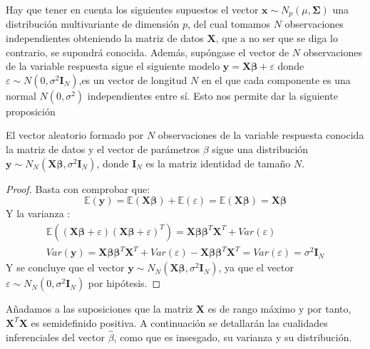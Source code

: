 \noindent Hay que tener en cuenta los siguientes supuestos el vector $\mathbf{x}\sim N_p(\mu, \mathbf{\Sigma})$ una distribución multivariante de dimensión $p$, del cual tomamos $N$ observaciones independientes obteniendo la matriz de datos $\mathbf{X}$, que a no ser que se diga lo contrario, se supondrá conocida. Además, supóngase el vector de $N$ observaciones de la variable respuesta sigue el siguiente modelo $\mathbf{y}= \mathbf{X \beta}+\varepsilon$ donde $\varepsilon \sim N(0,\sigma^2\mathbf{I}_N)$,es un vector de longitud $N$ en el que cada componente es una normal $N(0,\sigma^2)$  independientes entre sí. Esto nos permite dar la siguiente proposición \cite{Cuadras 2014}
\begin{propo}
El vector aleatorio formado por $N$ observaciones de la variable respuesta conocida la matriz de datos y el vector de parámetros $\beta$ sigue una distribución
$\mathbf{y}\sim N_N(\mathbf{X\beta}, \sigma^2\mathbf{I}_N)$, donde $\mathbf{I}_N$ es la matriz identidad de tamaño $N$.  
\begin{proof}
Basta con comprobar que:
\begin{equation}
\mathbb{E}(\mathbf{y})=\mathbb{E}(\mathbf{X\beta})+\mathbb{E}(\varepsilon)=\mathbb{E}(\mathbf{X\beta})=\mathbf{X\beta}
\end{equation}
Y la varianza :
\begin{equation}
\begin{split}
\mathbb{E}((\mathbf{X\beta}+\varepsilon)(\mathbf{X\beta}+\varepsilon)^T)=\mathbf{X\beta}\mathbf{\beta}^T \mathbf{X}^T+ Var(\varepsilon
)\\
Var(\mathbf{y})=\mathbf{X\beta}\mathbf{\beta}^T \mathbf{X}^T+ Var(\varepsilon
)-\mathbf{X\beta}\mathbf{\beta}^T \mathbf{X}^T=Var(\varepsilon)=\sigma^2\mathbf{I}_N
\end{split}
\end{equation}
\noindent Y se concluye que el vector $\mathbf{y}\sim N_N(\mathbf{X\beta}, \sigma^2\mathbf{I}_N)$, ya que el vector $\varepsilon\sim N_N(0,\sigma^2 \mathbf{I}_N)$ por hipótesis. 
\end{proof}
\end{propo}

\noindent Añadamos a las suposiciones  que la matriz $\mathbf{X}$ es de rango máximo y por tanto, $\mathbf{X}^T\mathbf{X}$ es semidefinido positiva.
A continuación se detallarán las cualidades inferenciales del vector $\hat{\beta}$, como que es insesgado, su varianza y su distribución. 


